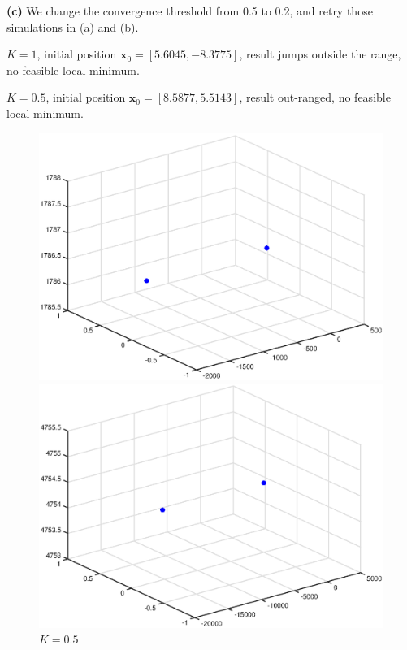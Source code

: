 \documentclass{article}
\begin{document}
\vspace{3mm}
\noindent
\textbf{(c)} We change the convergence threshold from 0.5 to 0.2, and retry those simulations in (a) and (b).

\vspace{2mm}

$K=1$, initial position $\mathbf{x}_0 = [5.6045,-8.3775]$, result jumps outside the range, no feasible local minimum.


$K=0.5$, initial position $\mathbf{x}_0 = [8.5877,5.5143]$, result out-ranged, no feasible local minimum.

\begin{figure}[h]
\begin{minipage}[t]{0.5\linewidth}
\centering
\includegraphics[scale=0.4]{16}
\caption{$K=1$}
\end{minipage}%
\begin{minipage}[t]{0.5\linewidth}
\centering
\includegraphics[scale=0.4]{17}
\caption{$K=0.5$}
\end{minipage}
\end{figure}
\end{document}
